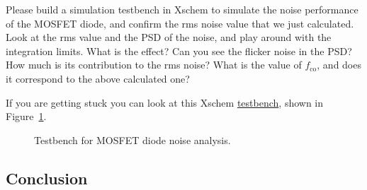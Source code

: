 \documentclass[
  a4paper,
  DIV=11,
  numbers=noendperiod]{scrartcl}
\begin{document}
\begin{tcolorbox}[enhanced jigsaw, titlerule=0mm, left=2mm, coltitle=black, toprule=.15mm, breakable, opacitybacktitle=0.6, colframe=quarto-callout-tip-color-frame, bottomtitle=1mm, toptitle=1mm, opacityback=0, colbacktitle=quarto-callout-tip-color!10!white, title=\textcolor{quarto-callout-tip-color}{\faLightbulb}\hspace{0.5em}{Exercise: MOSFET Diode Noise}, arc=.35mm, rightrule=.15mm, colback=white, bottomrule=.15mm, leftrule=.75mm]

Please build a simulation testbench in Xschem to simulate the noise
performance of the MOSFET diode, and confirm the rms noise value that we
just calculated. Look at the rms value and the PSD of the noise, and
play around with the integration limits. What is the effect? Can you see
the flicker noise in the PSD? How much is its contribution to the rms
noise? What is the value of \(f_\mathrm{co}\), and does it correspond to
the above calculated one?

If you are getting stuck you can look at this Xschem
\href{./xschem/mosfet_diode_noise.sch}{testbench}, shown in
Figure~\ref{fig-mosfet-diode-noise-tb}.

\begin{figure}[H]


\caption{\label{fig-mosfet-diode-noise-tb}Testbench for MOSFET diode
noise analysis.}

\end{figure}%

\end{tcolorbox}

\subsection{Conclusion}\label{conclusion-1}
\end{document}
